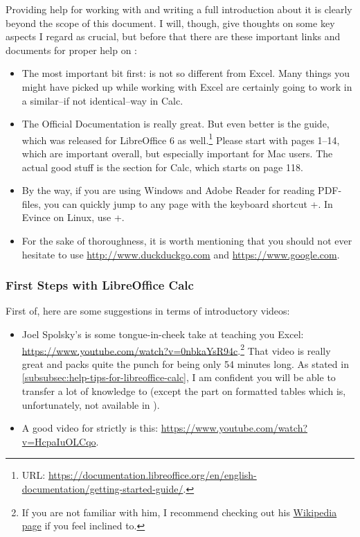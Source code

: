 Providing help for working with \loc and writing a full introduction about it is clearly beyond the scope of this document.
I will, though, give thoughts on some key aspects I regard as crucial, but before that there are these important links and documents for proper help on \loc:
\begin{itemize}
	\item The most important bit first: \loc is not so different from Excel.
	Many things you might have picked up while working with Excel are certainly going to work in a similar--if not identical--way in Calc.
	\item The Official Documentation is really great.
	But even better is the  guide, which was released for LibreOffice 6 as well.\footnote{URL: \href{https://documentation.libreoffice.org/en/english-documentation/getting-started-guide/}{https://documentation.libreoffice.org/en/english-documentation/getting-started-guide/}.}
	Please start with pages 1--14, which are important overall, but especially important for Mac users.
	The actual good stuff is the section for Calc, which starts on page 118.
	\item By the way, if you are using Windows and Adobe Reader for reading PDF-files, you can quickly jump to any page with the keyboard shortcut +.
	In Evince on Linux, use +.
	\item For the sake of thoroughness, it is worth mentioning that you should  not ever hesitate to use \href{http://www.duckduckgo.com}{http://www.duckduckgo.com} and  \href{https://www.google.com}{https://www.google.com}.
\end{itemize}

\subsubsection{First Steps with LibreOffice Calc}
\label{subsubsec:first-steps-with-libreoffice-calc}

First of, here are some suggestions in terms of introductory videos:
\begin{itemize}
	\item Joel Spolsky's  is some tongue-in-cheek take at teaching you Excel: \url{https://www.youtube.com/watch?v=0nbkaYsR94c}.\footnote{If you are not familiar with him, I recommend checking out his \href{https://en.wikipedia.org/wiki/Joel_Spolsky}{Wikipedia page} if you feel inclined to.}
	That video is really great and packs quite the punch for being only 54 minutes long.
	As stated in \autoref{subsubsec:help-tips-for-libreoffice-calc}, I am confident you will be able to transfer a lot of knowledge to \loc (except the part on formatted tables which is, unfortunately, not available in \loc).
	\item A good video for strictly \loc is this: \url{https://www.youtube.com/watch?v=HcpaIuOLCqo}.
\end{itemize}

